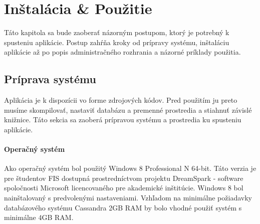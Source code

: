 \chapter{Inštalácia \& Použitie}
	Táto kapitola sa bude zaoberať názorným postupom, ktorý je potrebný k spusteniu aplikácie. Postup zahŕňa kroky od prípravy systému, inštaláciu aplikácie až po popis administračného rozhrania a názorné príklady použitia.
	
		
\section{Príprava systému}
	Aplikácia je k dispozícii vo forme zdrojových kódov. Pred použitím ju preto musíme skompilovať, nastaviť databázu a premenné prostredia a stiahnuť závislé knižnice. Táto sekcia sa zaoberá prípravou systému a prostredia ku spusteniu aplikácie.

\subsubsection{Operačný systém}
	Ako operačný systém bol použitý Windows 8 Professional N 64-bit. Táto verzia je pre študentov FIS dostupná prostredníctvom projektu DreamSpark - software spoločnosti Microsoft licencovaného pre akademické inštitúcie. Windows 8 bol nainštalovaný s predvolenými nastaveniami. Vzhľadom na minimálne požiadavky databázového systému Cassandra 2GB RAM by bolo vhodné použiť systém s minimálne 4GB RAM.


